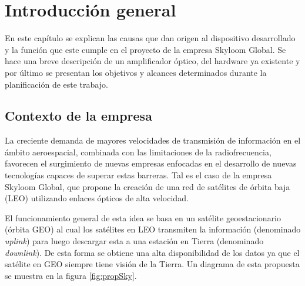 
\chapter{Introducción general} %

\label{Chapter1} %
\label{IntroGeneral}


\newcommand{\keyword}[1]{\textbf{#1}}
\newcommand{\tabhead}[1]{\textbf{#1}}
\newcommand{\code}[1]{\texttt{#1}}
\newcommand{\file}[1]{\texttt{\bfseries#1}}
\newcommand{\option}[1]{\texttt{\itshape#1}}
\newcommand{\grados}{$^{\circ}$}


En este capítulo se explican las causas que dan origen al dispositivo desarrollado y la función que este cumple en el proyecto de la empresa Skyloom Global. Se hace una breve descripción de un amplificador óptico, del hardware ya existente y por último se presentan los objetivos y alcances determinados durante la planificación de este trabajo.


\section{Contexto de la empresa}
\label{sec:contexto}

La creciente demanda de mayores velocidades de transmisión de información en el ámbito aeroespacial, combinada con las limitaciones de la radiofrecuencia, favorecen el surgimiento de nuevas empresas enfocadas en el desarrollo de nuevas tecnologías capaces de superar estas barreras. Tal es el caso de la empresa Skyloom Global, que propone la creación de una red de satélites de órbita baja (LEO) \citep{WEBSITE:LEO} utilizando enlaces ópticos de alta velocidad.

El funcionamiento general de esta idea se basa en un satélite geoestacionario (órbita GEO) \citep{WEBSITE:GEO} al cual los satélites en LEO transmiten la información (denominado \textit{uplink}) para luego descargar esta a una estación en Tierra (denominado \textit{downlink}). De esta forma se obtiene una alta disponibilidad de los datos ya que el satélite en GEO siempre tiene visión de la Tierra. Un diagrama de esta propuesta se muestra en la figura \ref{fig:propSky}.

